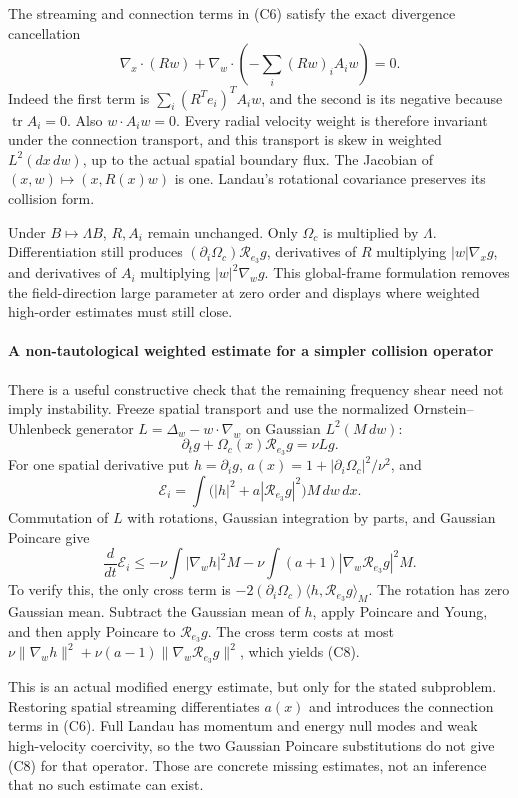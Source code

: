 The streaming and connection terms in (C6) satisfy the exact divergence
cancellation \[
\nabla_x\cdot(Rw)
+\nabla_w\cdot\left(-\sum_i(Rw)_iA_iw\right)=0.
\tag{C7}
\] Indeed the first term is \(\sum_i(R^Te_i)^TA_iw\), and the second is
its negative because \(\operatorname{tr}A_i=0\). Also \(w\cdot A_iw=0\).
Every radial velocity weight is therefore invariant under the connection
transport, and this transport is skew in weighted \(L^2(dx\,dw)\), up to
the actual spatial boundary flux. The Jacobian of
\((x,w)\mapsto(x,R(x)w)\) is one. Landau's rotational covariance
preserves its collision form.

Under \(B\mapsto\Lambda B\), \(R,A_i\) remain unchanged. Only
\(\Omega_c\) is multiplied by \(\Lambda\). Differentiation still
produces \((\partial_i\Omega_c)\mathcal R_{e_3}g\), derivatives of \(R\)
multiplying \(|w|\nabla_xg\), and derivatives of \(A_i\) multiplying
\(|w|^2\nabla_wg\). This global-frame formulation removes the
field-direction large parameter at zero order and displays where
weighted high-order estimates must still close.

\paragraph{A non-tautological weighted estimate for a simpler
collision
operator}\label{a-non-tautological-weighted-estimate-for-a-simpler-collision-operator}

There is a useful constructive check that the remaining frequency shear
need not imply instability. Freeze spatial transport and use the
normalized Ornstein--Uhlenbeck generator \(L=\Delta_w-w\cdot\nabla_w\)
on Gaussian \(L^2(M\,dw)\): \[
\partial_tg+\Omega_c(x)\mathcal R_{e_3}g=\nu Lg.
\] For one spatial derivative put \(h=\partial_i g\),
\(a(x)=1+|\partial_i\Omega_c|^2/\nu^2\), and \[
\mathcal E_i=\int\big(|h|^2+a|\mathcal R_{e_3}g|^2\big)M\,dw\,dx.
\] Commutation of \(L\) with rotations, Gaussian integration by parts,
and Gaussian Poincare give \[
\frac d{dt}\mathcal E_i
\le-\nu\int|\nabla_wh|^2M
    -\nu\int(a+1)|\nabla_w\mathcal R_{e_3}g|^2M.
\tag{C8}
\] To verify this, the only cross term is
\(-2(\partial_i\Omega_c)\langle h,\mathcal R_{e_3}g\rangle_M\). The
rotation has zero Gaussian mean. Subtract the Gaussian mean of \(h\),
apply Poincare and Young, and then apply Poincare to
\(\mathcal R_{e_3}g\). The cross term costs at most
\(\nu\|\nabla_wh\|^2+\nu(a-1)\|\nabla_w\mathcal R_{e_3}g\|^2\), which
yields (C8).

This is an actual modified energy estimate, but only for the stated
subproblem. Restoring spatial streaming differentiates \(a(x)\) and
introduces the connection terms in (C6). Full Landau has momentum and
energy null modes and weak high-velocity coercivity, so the two Gaussian
Poincare substitutions do not give (C8) for that operator. Those are
concrete missing estimates, not an inference that no such estimate can
exist.

